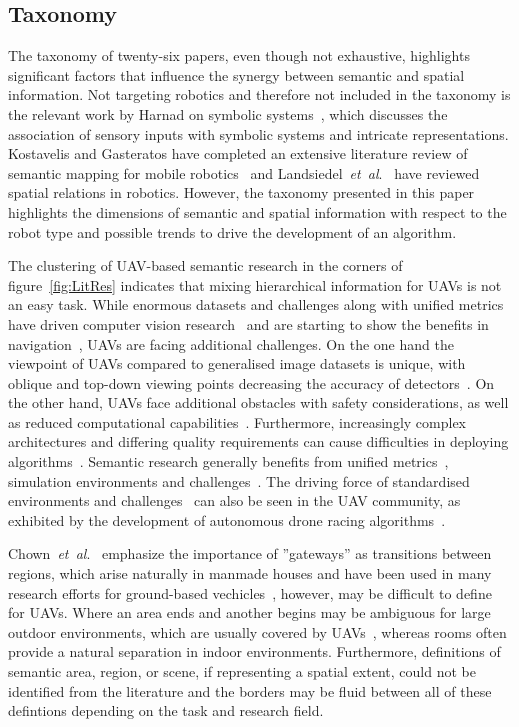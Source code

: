 \documentclass[twocolumn,letterpaper]{IEEEAerospaceCLS}  %
\newcommand{\abbreviation}[1]{\emph{#1}.}
\newcommand{\etal}{\abbreviation{et~al}}
\begin{document}
\subsection{Taxonomy} \label{ssec:DiscLit}
The taxonomy of twenty-six papers, even though not exhaustive, highlights significant factors that influence the synergy between semantic and spatial information. Not targeting robotics and therefore not included in the taxonomy is the relevant work by Harnad on symbolic systems~\cite{harnad_symbol_1990}, which discusses the association of sensory inputs with symbolic systems and intricate representations. Kostavelis and Gasteratos have completed an extensive literature review of semantic mapping for mobile robotics~\cite{kostavelis_semantic_2015} and Landsiedel~\etal~\cite{landsiedel_review_2017} have reviewed spatial relations in robotics. However, the taxonomy presented in this paper highlights the dimensions of semantic and spatial information with respect to the robot type and possible trends to drive the development of an algorithm.

The clustering of UAV-based semantic research in the corners of figure~\ref{fig:LitRes} indicates that mixing hierarchical information for UAVs is not an easy task. While enormous datasets and challenges along with unified metrics have driven computer vision research~\cite{alom_history_2018,corke_what_2020} and are starting to show the benefits in navigation~\cite{anderson_evaluation_2018,chaplot_object_2020}, UAVs are facing additional challenges.
On the one hand the viewpoint of UAVs compared to generalised image datasets is unique, with oblique and top-down viewing points decreasing the accuracy of detectors~\cite{richardwebster_psyphy:_2019}. On the other hand, UAVs face additional obstacles with safety considerations, as well as reduced computational capabilities~\cite{boroujerdian_mavbench_2018,mandel_method_2020}. Furthermore, increasingly complex architectures and differing quality requirements can cause difficulties in deploying algorithms~\cite{cervera_try_2019,malatova_how_2020}. 
Semantic research generally benefits from unified metrics~\cite{anderson_evaluation_2018}, simulation environments and challenges~\cite{chaplot_object_2020,yang_visual_2018}. The driving force of standardised environments and challenges~\cite{corke_what_2020} can also be seen in the UAV community, as exhibited by the development of autonomous drone racing algorithms~\cite{moon_challenges_2019}.

Chown~\etal~\cite{chown_prototypes_1995} emphasize the importance of ''gateways'' as transitions between regions, which arise naturally in manmade houses and have been used in many research efforts for ground-based vechicles~\cite{kuipers_local_2004,wu_learning_2018,krishnan_visual_2010}, however, may be difficult to define for UAVs. Where an area ends and another begins may be ambiguous for large outdoor environments, which are usually covered by UAVs~\cite{vanegas_novel_2018,shetty_implementation_2020}, whereas rooms often provide a natural separation in indoor environments. Furthermore, definitions of semantic area, region, or scene, if representing a spatial extent, could not be identified from the literature and the borders may be fluid between all of these defintions depending on the task and research field.
\end{document}
